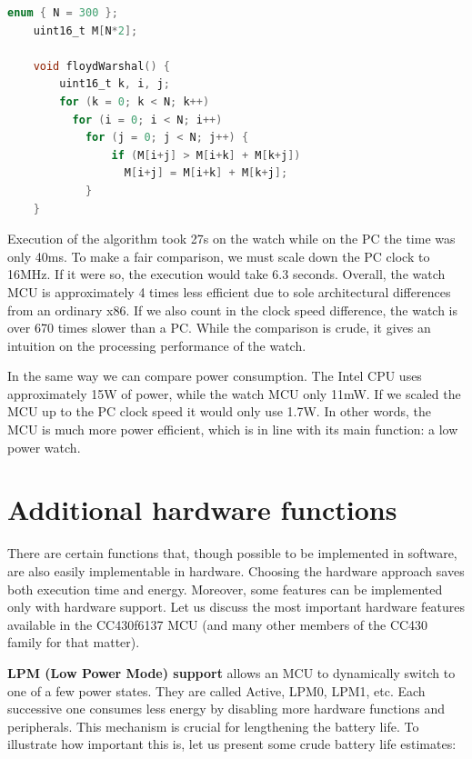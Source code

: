 \begin{lstlisting}[numbers=none, keywordstyle=\bfseries, language=C]
    enum { N = 300 };
    uint16_t M[N*2];

    void floydWarshal() {
        uint16_t k, i, j;
        for (k = 0; k < N; k++)
          for (i = 0; i < N; i++)
            for (j = 0; j < N; j++) {
                if (M[i+j] > M[i+k] + M[k+j])
                  M[i+j] = M[i+k] + M[k+j];
            }
    }
\end{lstlisting}

Execution of the algorithm took 27s on the watch while on the PC the
time was only 40ms.  To make a fair comparison, we must scale down the
PC clock to 16MHz. If it were so, the execution would take 6.3
seconds. Overall, the watch MCU is approximately 4 times less
efficient due to sole architectural differences from an ordinary x86.
If we also count in the clock speed difference, the watch is over 670
times slower than a PC. While the comparison is crude, it gives an
intuition on the processing performance of the watch.

In the same way we can compare power consumption.  The Intel CPU uses
approximately 15W of power, while the watch MCU only 11mW. If we
scaled the MCU up to the PC clock speed it would only use 1.7W. In
other words, the MCU is much more power efficient, which is in line
with its main function: a low power watch.

\section{Additional hardware functions}
\label{ch:hardware_functions}

There are certain functions that, though possible to be implemented in
software, are also easily implementable in hardware. Choosing the
hardware approach saves both execution time and energy. Moreover, some
features can be implemented only with hardware support. Let us discuss
the most important hardware features available in the CC430f6137 MCU
(and many other members of the CC430 family for that matter).

{\bf LPM (Low Power Mode) support} allows an MCU to dynamically switch to
one of a few power states.  They are called Active, LPM0, LPM1, etc.
Each successive one consumes less energy by disabling more hardware
functions and peripherals. This mechanism is crucial for lengthening
the battery life. To illustrate how important this is, let us present
some crude battery life estimates:

